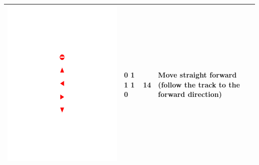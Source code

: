 \documentclass[a4paper,twoside]{article}
\begin{document}
\begin{table}[!h]
\begin{tabular}{|C{1.3cm}|C{1.3cm}|C{1.3cm}|C{2cm}|}
		\begin{minipage}{.075\textwidth}\includegraphics[scale=.5,trim=9.1cm 16cm 9.5cm 10.5cm,clip]{signs.pdf}\end{minipage}	& 0 1 1 1 0	& 14 & Move straight forward (follow the track to the forward direction) \\ \hline

\end{tabular}
\end{table}
\end{document}
